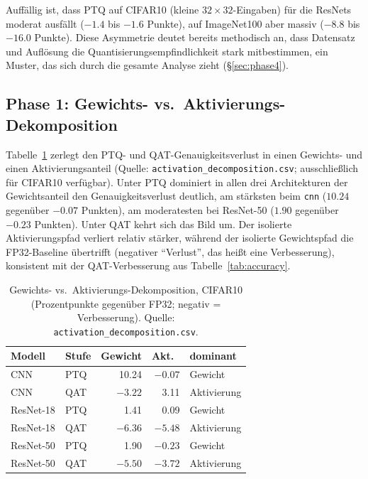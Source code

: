 Auffällig ist, dass PTQ auf CIFAR10 (kleine $32\times32$-Eingaben) für die ResNets moderat ausfällt ($-1.4$ bis $-1.6$ Punkte), auf ImageNet100 aber massiv ($-8.8$ bis $-16.0$ Punkte). Diese Asymmetrie deutet bereits methodisch an, dass Datensatz und Auflösung die Quantisierungsempfindlichkeit stark mitbestimmen, ein Muster, das sich durch die gesamte Analyse zieht (\S\ref{sec:phase4}).

\subsection{Phase 1: Gewichts- vs.\ Aktivierungs-Dekomposition}
\label{sec:phase1-results}

Tabelle~\ref{tab:decomposition} zerlegt den PTQ- und QAT-Genauigkeitsverlust in einen Gewichts- und einen Aktivierungsanteil (Quelle: \texttt{activation\_decomposition.csv}; ausschließlich für CIFAR10 verfügbar). Unter PTQ dominiert in allen drei Architekturen der Gewichtsanteil den Genauigkeitsverlust deutlich, am stärksten beim \texttt{cnn} ($10.24$ gegenüber $-0.07$ Punkten), am moderatesten bei ResNet-50 ($1.90$ gegenüber $-0.23$ Punkten). Unter QAT kehrt sich das Bild um. Der isolierte Aktivierungspfad verliert relativ stärker, während der isolierte Gewichtspfad die FP32-Baseline übertrifft (negativer \enquote{Verlust}, das heißt eine Verbesserung), konsistent mit der QAT-Verbesserung aus Tabelle~\ref{tab:accuracy}.

\begin{table}[t]
\centering
\small
\caption{Gewichts- vs.\ Aktivierungs-Dekomposition, CIFAR10 (Prozentpunkte gegenüber FP32; negativ = Verbesserung). Quelle: \texttt{activation\_decomposition.csv}.}
\label{tab:decomposition}
\begin{tabular}{llrrl}
\toprule
Modell & Stufe & Gewicht & Akt.\ & dominant \\
\midrule
CNN & PTQ & 10.24 & $-0.07$ & Gewicht \\
CNN & QAT & $-3.22$ & 3.11 & Aktivierung \\
ResNet-18 & PTQ & 1.41 & 0.09 & Gewicht \\
ResNet-18 & QAT & $-6.36$ & $-5.48$ & Aktivierung \\
ResNet-50 & PTQ & 1.90 & $-0.23$ & Gewicht \\
ResNet-50 & QAT & $-5.50$ & $-3.72$ & Aktivierung \\
\bottomrule
\end{tabular}
\end{table}

